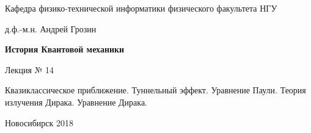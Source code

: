 \documentclass[12pt,pagesize,paper=landscape,paper=192mm:108mm]{scrbook}
\begin{document}
\begin{titlepage}
\begin{center}
    Кафедра физико-технической информатики физического факультета НГУ
    \medskip

    \Large
    д.ф.-м.н. Андрей Грозин
    
    \bigskip

    \huge
    \textbf{История Квантовой механики}
    \bigskip

    \Large
    Лекция № 14
    \vfill

    \normalsize
    \begin{minipage}{0.6\linewidth}
      Квазиклассическое приближение. Туннельный эффект. Уравнение
      Паули.  Теория излучения Дирака. Уравнение Дирака.
    \end{minipage}
    \vfill

    \normalsize \ccbysa\hspace{0.5em}  Новосибирск 2018
  \end{center}
\end{titlepage}
\end{document}
